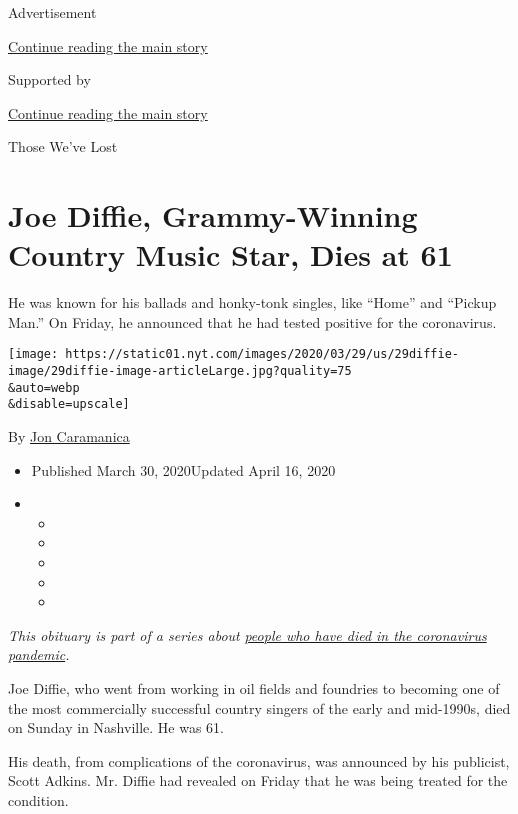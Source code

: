 Advertisement

\protect\hyperlink{after-top}{Continue reading the main story}

Supported by

\protect\hyperlink{after-sponsor}{Continue reading the main story}

Those We've Lost

\hypertarget{joe-diffie-grammy-winning-country-music-star-dies-at-61}{%
\section{Joe Diffie, Grammy-Winning Country Music Star, Dies at
61}\label{joe-diffie-grammy-winning-country-music-star-dies-at-61}}

He was known for his ballads and honky-tonk singles, like ``Home'' and
``Pickup Man.'' On Friday, he announced that he had tested positive for
the coronavirus.

\texttt{[image: https://static01.nyt.com/images/2020/03/29/us/29diffie-image/29diffie-image-articleLarge.jpg?quality=75\\\&auto=webp\\\&disable=upscale]}

By \href{https://www.nytimes.com/by/jon-caramanica}{Jon Caramanica}

\begin{itemize}
\item
  Published March 30, 2020Updated April 16, 2020
\item
  \begin{itemize}
  \item
  \item
  \item
  \item
  \item
  \end{itemize}
\end{itemize}

\emph{This obituary is part of a series about}
\href{https://www.nytimes.com/series/people-who-have-died-of-the-coronavirus}{\emph{people
who have died in the coronavirus pandemic}}\emph{.}

Joe Diffie, who went from working in oil fields and foundries to
becoming one of the most commercially successful country singers of the
early and mid-1990s, died on Sunday in Nashville. He was 61.

His death, from complications of the coronavirus, was announced by his
publicist, Scott Adkins. Mr. Diffie had revealed on Friday that he was
being treated for the condition.

